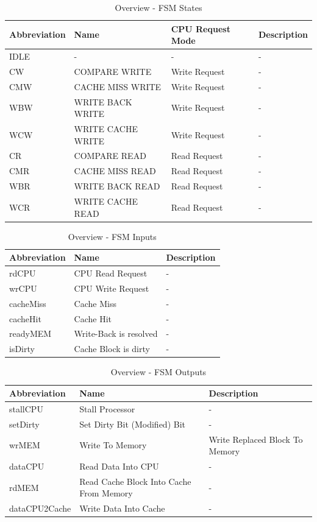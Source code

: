 \begin{table}
\caption{Overview - FSM States}
\label{tab:tableFSMStates}
\begin{tabular}{llll}
\hline %
Abbreviation & Name & CPU Request Mode & Description \\
\hline %
IDLE 	& -					& - 			& - \\
CW		& COMPARE WRITE		& Write Request & - \\
CMW		& CACHE MISS WRITE	& Write Request & - \\
WBW		& WRITE BACK WRITE	& Write Request & - \\
WCW		& WRITE CACHE WRITE	& Write Request & - \\
CR		& COMPARE READ		& Read Request 	& - \\
CMR		& CACHE MISS READ	& Read Request 	& - \\
WBR		& WRITE BACK READ	& Read Request 	& - \\
WCR		& WRITE CACHE READ	& Read Request 	& - \\
\hline %
\end{tabular} 
\end{table}

\begin{table}
	\caption{Overview - FSM Inputs}
	\label{tab:tableFSMInputs}
	\begin{tabular}{lll}
	\hline %
	Abbreviation & Name & Description \\
	\hline %
	rdCPU 		& CPU Read Request			& - \\
	wrCPU 		& CPU Write Request 		& - \\
	cacheMiss 	& Cache Miss 				& - \\
	cacheHit	& Cache Hit					& - \\
	readyMEM 	& Write-Back is resolved 	& - \\
	isDirty		& Cache Block is dirty		& - \\
	\hline %
	\end{tabular}
\end{table}
	
\begin{table}
	\caption{Overview - FSM Outputs}
	\label{tab:tableFSMOutputs}
	\begin{tabular}{lll}
	\hline %
	Abbreviation & Name & Description \\
	\hline %
	stallCPU		& Stall Processor				& - \\
	setDirty		& Set Dirty Bit (Modified) Bit 	& - \\
	wrMEM			& Write To Memory				& Write Replaced Block To Memory \\
	dataCPU			& Read Data Into CPU			& - \\
	rdMEM			& Read Cache Block Into Cache From Memory & - \\
	dataCPU2Cache	& Write Data Into Cache			& - \\
	\hline %
	\end{tabular}
\end{table}


